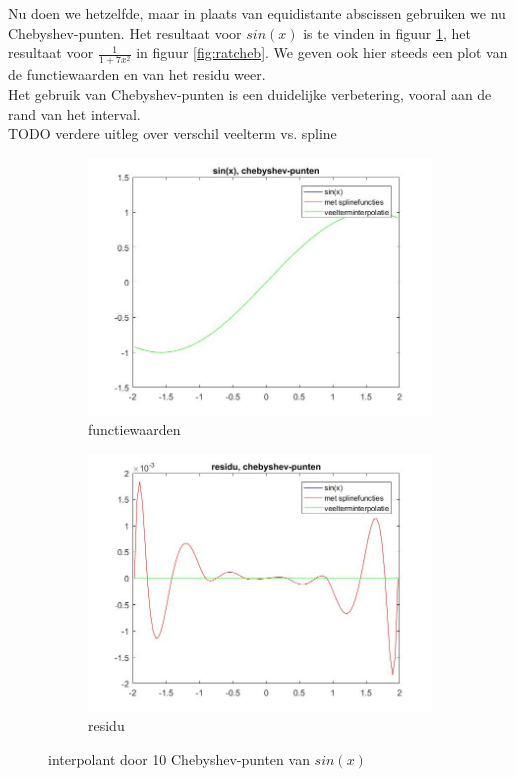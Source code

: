Nu doen we hetzelfde, maar in plaats van equidistante abscissen gebruiken we nu Chebyshev-punten. Het  resultaat voor $sin(x)$ is te vinden in figuur \ref{fig:sincheb}, het resultaat voor $\frac{1}{1+7x^2}$ in figuur \ref{fig:ratcheb}. We geven ook hier steeds een plot van de functiewaarden en van het residu weer.
\\
Het gebruik van Chebyshev-punten is een duidelijke verbetering, vooral aan de rand van het interval. 
\\
TODO verdere uitleg over verschil veelterm vs. spline

\begin{figure}
\centering
\begin{subfigure}{.5\textwidth}
  \centering
  \includegraphics[width=\linewidth]{afbeeldingen/sin_cheb.jpg}
  \caption{functiewaarden}
\end{subfigure}%
\begin{subfigure}{.5\textwidth}
  \centering
  \includegraphics[width=\linewidth]{afbeeldingen/sin_cheb_res.jpg}
  \caption{residu}
\end{subfigure}
\caption{interpolant door 10 Chebyshev-punten van $sin(x)$}
\label{fig:sincheb}
\end{figure}

